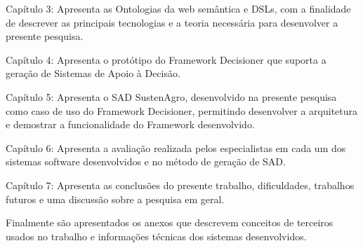 Capítulo 3: Apresenta as Ontologias da web semântica e \foreignlanguage{english}{DSLs},
com a finalidade de descrever as principais tecnologias e a teoria
necessária para desenvolver a presente pesquisa.

Capítulo 4: Apresenta o protótipo do Framework Decisioner que suporta
a geração de Sistemas de Apoio à Decisão. 

Capítulo 5: Apresenta o SAD SustenAgro, desenvolvido na presente pesquisa
como caso de uso do Framework Decisioner, permitindo desenvolver a
arquitetura e demostrar a funcionalidade do Framework desenvolvido.

Capítulo 6: Apresenta a avaliação realizada pelos especialistas em
cada um dos sistemas software desenvolvidos e no método de geração
de SAD.

Capítulo 7: Apresenta as conclusões do presente trabalho, dificuldades,
trabalhos futuros e uma discussão sobre a pesquisa em geral.

Finalmente são apresentados os anexos que descrevem conceitos de terceiros
usados no trabalho e informações técnicas dos sistemas desenvolvidos.
